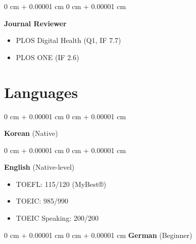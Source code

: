 \documentclass[11pt, letterpaper]{article}
\newenvironment{highlights}{
    \begin{itemize}[
        topsep=0.10 cm,
        parsep=0.10 cm,
        partopsep=0pt,
        itemsep=0pt,
        leftmargin=0 cm + 10pt
    ]
}{
    \end{itemize}
} %
\newenvironment{onecolentry}{
    \Needspace{3\baselineskip}
    \begin{adjustwidth}{
        0 cm + 0.00001 cm
    }{
        0 cm + 0.00001 cm
    }
}{
    \end{adjustwidth}
} %
\begin{document}
\begin{onecolentry}
    \textbf{Journal Reviewer}
    \begin{highlights}
        \item PLOS Digital Health (Q1, IF 7.7)
        \item PLOS ONE (IF 2.6)
    \end{highlights}
\end{onecolentry}
\vspace{0.15 cm}

\section{Languages}
    
        \begin{onecolentry}
        \textbf{Korean} (Native)  
        \end{onecolentry}
         \vspace{0.15 cm}
        \begin{onecolentry}
        \textbf{English} (Native-level) \\
            \begin{highlights}
                \item TOEFL: 115/120 (MyBest®)
                \item TOEIC: 985/990
                \item TOEIC Speaking: 200/200
            \end{highlights}
        \end{onecolentry}
         \vspace{0.15 cm}
        \begin{onecolentry}{}
        \textbf{German} (Beginner) \\
        \end{onecolentry}
\end{document}
